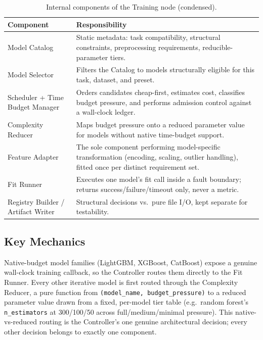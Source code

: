 \begin{table}[H]
\centering
\begin{tabularx}{\textwidth}{l X}
\toprule
\textbf{Component} & \textbf{Responsibility} \\
\midrule
Model Catalog & Static metadata: task compatibility, structural constraints, preprocessing requirements, reducible-parameter tiers. \\
Model Selector & Filters the Catalog to models structurally eligible for this task, dataset, and preset. \\
Scheduler + Time Budget Manager & Orders candidates cheap-first, estimates cost, classifies budget pressure, and performs admission control against a wall-clock ledger. \\
Complexity Reducer & Maps budget pressure onto a reduced parameter value for models without native time-budget support. \\
Feature Adapter & The sole component performing model-specific transformation (encoding, scaling, outlier handling), fitted once per distinct requirement set. \\
Fit Runner & Executes one model's fit call inside a fault boundary; returns success/failure/timeout only, never a metric. \\
Registry Builder / Artifact Writer & Structural decisions vs.\ pure file I/O, kept separate for testability. \\
\bottomrule
\end{tabularx}
\caption{Internal components of the Training node (condensed).}
\label{tab:training-components-brief}
\end{table}

\subsection{Key Mechanics}
\label{subsec:training-mechanics}

Native-budget model families (LightGBM, XGBoost, CatBoost) expose a genuine wall-clock training callback, so the Controller routes them directly to the Fit Runner. Every other iterative model is first routed through the Complexity Reducer, a pure function from \texttt{(model\_name, budget\_pressure)} to a reduced parameter value drawn from a fixed, per-model tier table (e.g.\ random forest's \texttt{n\_estimators} at 300/100/50 across full/medium/minimal pressure). This native-vs-reduced routing is the Controller's one genuine architectural decision; every other decision belongs to exactly one component.

